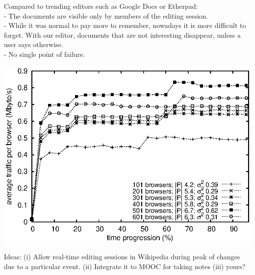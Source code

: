 \documentclass[a1paper, fontscale=0.4, portrait]{baposter}
\begin{document}
\begin{poster}
{\begin{minipage}[c]{.5\linewidth}
      Compared to trending editors such as Google Docs or Etherpad:\\
      - The documents are visible only by members of the editing session.\\
      - While it was normal to pay more to remember, nowadays it is more
      difficult to forget. With our editor, documents that are not interesting
      disappear,
      unless a user says otherwise.\\
      - No single point of failure. \\
     
    \end{minipage} \hfill
    \begin{minipage}[c]{.5\linewidth}
      \centering
      \includegraphics[scale=0.5]{img/traffic.eps}
    \end{minipage}

    Ideas: (i) Allow real-time editing sessions in Wikipedia during peak of
    changes due to a particular event. (ii) Integrate it to MOOC for taking
    notes (iii) yours?
  }


\end{poster}
\end{document}
